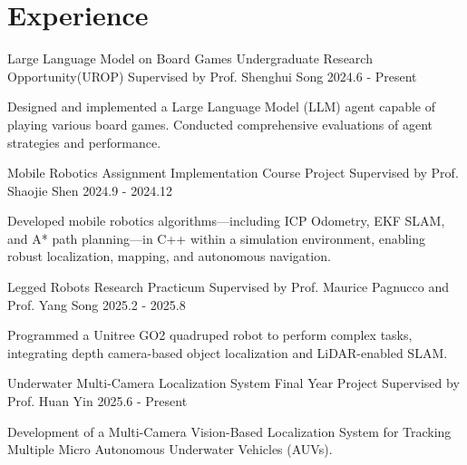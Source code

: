 \section{Experience}

\cventry
{Large Language Model on Board Games} %
{Undergraduate Research Opportunity(UROP)} %
{Supervised by Prof. Shenghui Song} %
{2024.6 - Present} %
\begin{cvitems}
\item {Designed and implemented a Large Language Model (LLM) agent capable of playing various board games. Conducted comprehensive evaluations of agent strategies and performance.}
\end{cvitems}

\cventry
{Mobile Robotics Assignment Implementation} %
{Course Project} %
{Supervised by Prof. Shaojie Shen} %
{2024.9 - 2024.12} %
\begin{cvitems}
\item {Developed mobile robotics algorithms—including ICP Odometry, EKF SLAM, and A* path planning—in C++ within a simulation environment, enabling robust localization, mapping, and autonomous navigation.}
\end{cvitems}

\cventry
{Legged Robots} %
{Research Practicum} %
{Supervised by Prof. Maurice Pagnucco and Prof. Yang Song} %
{2025.2 - 2025.8} %
\begin{cvitems}
\item {Programmed a Unitree GO2 quadruped robot to perform complex tasks, integrating depth camera-based object localization and LiDAR-enabled SLAM.}
\end{cvitems}

\cventry
{Underwater Multi-Camera Localization System} %
{Final Year Project} %
{Supervised by Prof. Huan Yin} %
{2025.6 - Present} %
\begin{cvitems}
\item {Development of a Multi-Camera Vision-Based Localization System for Tracking Multiple Micro Autonomous Underwater Vehicles (AUVs).}
\end{cvitems}
